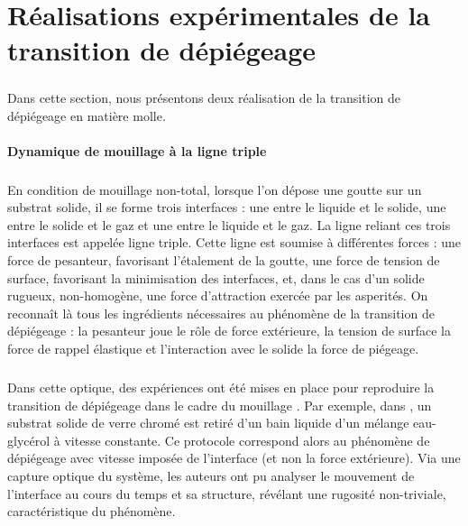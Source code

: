 \section{Réalisations expérimentales de la transition de dépiégeage}

\label{app:exp_depinning}

\subparagraph{}Dans cette section, nous présentons deux réalisation de la transition de dépiégeage en matière molle.

\paragraph{Dynamique de mouillage à la ligne triple}

\subparagraph{}En condition de mouillage non-total, lorsque l'on dépose une goutte sur un substrat solide, il se forme trois interfaces : une entre le liquide et le solide, une entre le solide et le gaz et une entre le liquide et le gaz. La ligne reliant ces trois interfaces est appelée ligne triple. Cette ligne est soumise à différentes forces : une force de pesanteur, favorisant l'étalement de la goutte, une force de tension de surface, favorisant la minimisation des interfaces, et, dans le cas d'un solide rugueux, non-homogène, une force d'attraction exercée par les asperités. On reconnaît là tous les ingrédients nécessaires au phénomène de la transition de dépiégeage \cite{joanny_model_1984, rosso_depiegeage_2002, le_priol_long_range_2020} : la pesanteur joue le rôle de force extérieure, la tension de surface la force de rappel élastique et l'interaction avec le solide la force de piégeage.

\subparagraph{}Dans cette optique, des expériences ont été mises en place pour reproduire la transition de dépiégeage dans le cadre du mouillage \cite{moulinet_roughness_2002, le_doussal_height_2009}. Par exemple, dans \cite{moulinet_roughness_2002}, un substrat solide de verre chromé est retiré d'un bain liquide d'un mélange eau-glycérol à vitesse constante. Ce protocole correspond alors au phénomène de dépiégeage avec vitesse imposée de l'interface (et non la force extérieure). Via une capture optique du système, les auteurs ont pu analyser le mouvement de l'interface au cours du temps et sa structure, révélant une rugosité non-triviale, caractéristique du phénomène.

